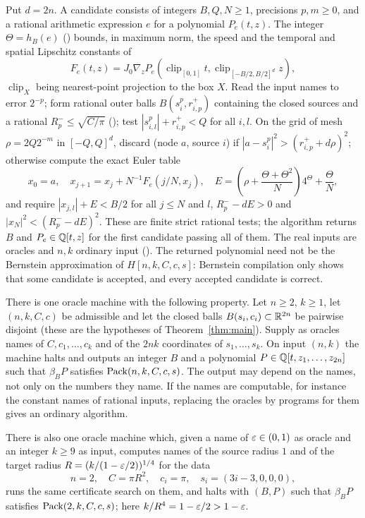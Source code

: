 Put $d=2n$. A candidate consists of integers $B,Q,N\ge1$, precisions $p,m\ge0$, and a rational arithmetic expression $e$ for a polynomial $P_e(t,z)$. The integer $\Theta=h_B(e)$ () bounds, in maximum norm, the speed and the temporal and spatial Lipschitz constants of
\[
 F_e(t,z)=J_0\nabla_zP_e(\operatorname{clip}_{[0,1]}t,
                  \operatorname{clip}_{[-B/2,B/2]^d}z),
\]
$\operatorname{clip}_X$ being nearest-point projection to the box $X$. Read the input names to error $2^{-p}$; form rational outer balls $B(s_i^p,r^+_{i,p})$ containing the closed sources and a rational $R^-_p\le\sqrt{C/\pi}$ (); test $|s^p_{i,l}|+r^+_{i,p}<Q$ for all $i,l$. On the grid of mesh $\rho=2Q2^{-m}$ in $[-Q,Q]^d$, discard (node $a$, source $i$) if $|a-s_i^p|^2>(r^+_{i,p}+d\rho)^2$; otherwise compute the exact Euler table
\[
 x_0=a,\quad x_{j+1}=x_j+N^{-1}F_e(j/N,x_j),\quad
 E=\left(\rho+\frac{\Theta+\Theta^2}{N}\right)4^\Theta+\frac{\Theta}{N},
\]
and require $|x_{j,l}|+E<B/2$ for all $j\le N$ and $l$, $R^-_p-dE>0$ and $|x_N|^2<(R^-_p-dE)^2$. These are finite strict rational tests; the algorithm returns $B$ and $P_e\in\mathbb{Q}[t,z]$ for the first candidate passing all of them. The real inputs are oracles and $n,k$ ordinary input (). The returned polynomial need not be the Bernstein approximation of $H[n,k,C,c,s]$: Bernstein compilation only shows that some candidate is accepted, and every accepted candidate is correct.

\begin{theorem}\label{thm:eff-algorithm}
There is one oracle machine with the following property. Let $n\ge2$, $k\ge1$, let $(n,k,C,c)$ be admissible and let
the closed balls $B(s_i,c_i)\subset\mathbb{R}^{2n}$ be pairwise disjoint (these are the hypotheses of
Theorem~\ref{thm:main}). Supply as oracles names of $C,c_1,\dots,c_k$ and of the $2nk$ coordinates
of $s_1,\dots,s_k$. On input $(n,k)$ the machine halts and outputs an integer $B$ and a polynomial
$P\in\mathbb{Q}[t,z_1,\ldots,z_{2n}]$ such that $\beta_BP$ satisfies $\mathrm{Pack}(n,k,C,c,s)$. The output may depend on the names,
not only on the numbers they name. If the names are computable, for instance the constant names of rational
inputs, replacing the oracles by programs for them gives an ordinary algorithm.

There is also one oracle machine which, given a name of $\varepsilon\in(0,1)$ as oracle and an integer $k\ge9$ as input,
computes names of the source radius $1$ and of the target radius $R=(k/(1-\varepsilon/2))^{1/4}$ for the data
\[
 n=2,\quad C=\pi R^2,\quad c_i=\pi,\quad s_i=(3i-3,0,0,0),
\]
runs the same certificate search on them, and halts with $(B,P)$ such that $\beta_BP$ satisfies $\mathrm{Pack}(2,k,C,c,s)$;
here $k/R^4=1-\varepsilon/2>1-\varepsilon$.
\end{theorem}

